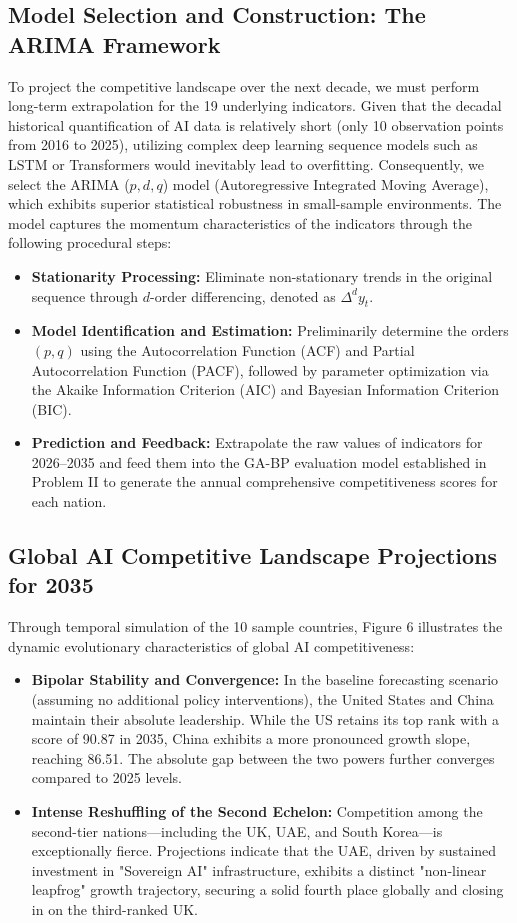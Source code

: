 \documentclass[12pt]{article}
\begin{document}
	\subsection{Model Selection and Construction: The ARIMA Framework}
	To project the competitive landscape over the next decade, we must perform long-term extrapolation for the 19 underlying indicators. Given that the decadal historical quantification of AI data is relatively short (only 10 observation points from 2016 to 2025), utilizing complex deep learning sequence models such as LSTM or Transformers would inevitably lead to overfitting.
	Consequently, we select the ARIMA ($p, d, q$) model (Autoregressive Integrated Moving Average), which exhibits superior statistical robustness in small-sample environments. The model captures the momentum characteristics of the indicators through the following procedural steps:
	\begin{itemize}
		\item \textbf{Stationarity Processing:} Eliminate non-stationary trends in the original sequence through $d$-order differencing, denoted as $\Delta^d y_t$.
		\item \textbf{Model Identification and Estimation:} Preliminarily determine the orders $(p, q)$ using the Autocorrelation Function (ACF) and Partial Autocorrelation Function (PACF), followed by parameter optimization via the Akaike Information Criterion (AIC) and Bayesian Information Criterion (BIC).
		\item \textbf{Prediction and Feedback:} Extrapolate the raw values of indicators for 2026–2035 and feed them into the GA-BP evaluation model established in Problem II to generate the annual comprehensive competitiveness scores for each nation.
	\end{itemize}
	
	\subsection{Global AI Competitive Landscape Projections for 2035}
	
	Through temporal simulation of the 10 sample countries, Figure 6 illustrates the dynamic evolutionary characteristics of global AI competitiveness:
	
	\begin{itemize}
		\item \textbf{Bipolar Stability and Convergence:} In the baseline forecasting scenario (assuming no additional policy interventions), the United States and China maintain their absolute leadership. While the US retains its top rank with a score of 90.87 in 2035, China exhibits a more pronounced growth slope, reaching 86.51. The absolute gap between the two powers further converges compared to 2025 levels.
		\item \textbf{Intense Reshuffling of the Second Echelon:} Competition among the second-tier nations—including the UK, UAE, and South Korea—is exceptionally fierce. Projections indicate that the UAE, driven by sustained investment in "Sovereign AI" infrastructure, exhibits a distinct "non-linear leapfrog" growth trajectory, securing a solid fourth place globally and closing in on the third-ranked UK.
	\end{itemize}
	
\end{document}
